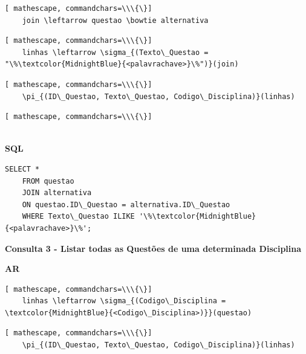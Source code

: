 \documentclass[12pt,a4paper]{article}
\begin{document}
\begin{Verbatim}[ mathescape, commandchars=\\\{\}]
    join \leftarrow questao \bowtie alternativa 
\end{Verbatim}
\begin{Verbatim}[ mathescape, commandchars=\\\{\}]
    linhas \leftarrow \sigma_{(Texto\_Questao = "\%\textcolor{MidnightBlue}{<palavrachave>}\%")}(join)
\end{Verbatim}
\begin{Verbatim}[ mathescape, commandchars=\\\{\}]
    \pi_{(ID\_Questao, Texto\_Questao, Codigo\_Disciplina)}(linhas)
\end{Verbatim}

\begin{Verbatim}[ mathescape, commandchars=\\\{\}]
    
\end{Verbatim}

\begin{center}
    \textbf{SQL}
\end{center}
\begin{Verbatim}[commandchars=\\\{\}]
    SELECT *
    FROM questao 
    JOIN alternativa 
    ON questao.ID\_Questao = alternativa.ID\_Questao 
    WHERE Texto\_Questao ILIKE '\%\textcolor{MidnightBlue}{<palavrachave>}\%';
\end{Verbatim}

\vspace{0.5cm}
\begin{center}
    \textbf{Consulta 3 - Listar todas as Questões de uma determinada Disciplina }
\end{center}
\begin{center}
    \textbf{AR}
\end{center}
\begin{Verbatim}[ mathescape, commandchars=\\\{\}]
    linhas \leftarrow \sigma_{(Codigo\_Disciplina = \textcolor{MidnightBlue}{<Codigo\_Disciplina>)}}(questao)
\end{Verbatim}


\begin{Verbatim}[ mathescape, commandchars=\\\{\}]
    \pi_{(ID\_Questao, Texto\_Questao, Codigo\_Disciplina)}(linhas)
\end{Verbatim}
\end{document}
